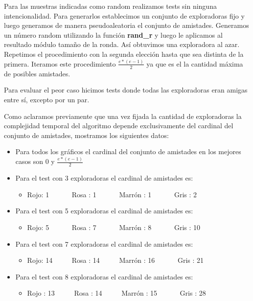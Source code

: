 \documentclass[11pt]{article}
\begin{document}
Para las muestras indicadas como random realizamos tests sin ninguna intencionalidad. Para generarlos establecimos un conjunto de 
exploradoras fijo y luego generamos de manera pseudoaleatoria el conjunto de amistades. Generamos un número random 
utilizando la función \textbf{rand\_r} y luego le aplicamos al resultado módulo tamaño de la ronda. Así obtuvimos una exploradora al azar. 
Repetimos el procedimiento con la segunda elección hasta que sea distinta de la primera. Iteramos este procedimiento $\frac{e*(e-1)}{2}$
ya que es el la cantidad máxima de posibles amistades.

Para evaluar el peor caso hicimos tests donde todas las exploradoras eran amigas entre sí, excepto por un par. 

Como aclaramos previamente que una vez fijada la cantidad de exploradoras la complejidad temporal del algoritmo 
depende exclusivamente del cardinal del conjunto de amistades, mostramos los siguientes datos:
\begin{itemize}
  \item Para todos los gráficos el cardinal del conjunto de amistades en los mejores casos son 0 y $\frac{e*(e-1)}{2}$
  \item Para el test con 3 exploradoras el cardinal de amistades es:
    \begin{itemize}
      \item Rojo: 1  \ \ \ \ \ \ \inlineitem Rosa : 1 \ \ \ \ \ \  \inlineitem Marrón : 1  \ \ \ \ \ \ \inlineitem Gris  : 2
    \end{itemize}
  \item Para el test con 5 exploradoras el cardinal de amistades es:
    \begin{itemize}
      \item Rojo: 5  \ \ \ \ \ \ \inlineitem Rosa : 7 \ \ \ \ \ \  \inlineitem Marrón : 8  \ \ \ \ \ \ \inlineitem Gris  : 10
    \end{itemize}
  \item Para el test con 7 exploradoras el cardinal de amistades es:
    \begin{itemize}
      \item Rojo: 14  \ \ \ \ \ \inlineitem Rosa : 14  \ \ \ \ \  \inlineitem Marrón : 16  \ \ \ \ \ \ \inlineitem Gris  : 21
    \end{itemize}
  \item Para el test con 8 exploradoras el cardinal de amistades es:
    \begin{itemize}
      \item Rojo : 13 \ \ \ \ \ \inlineitem Rosa : 14  \ \ \ \ \  \inlineitem Marrón : 15  \ \ \ \ \ \ \inlineitem Gris  : 28
    \end{itemize}
\end{itemize}
\end{document}
